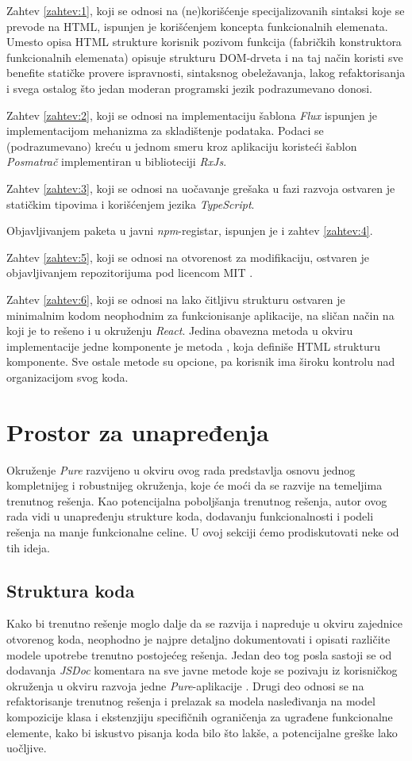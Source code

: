 \documentclass[12pt,oneside]{memoir}
\newcommand{\code}[1]{\allowbreak{\colorbox{codegray}{\texttt{\scalebox{0.9}{#1}}}}}%
\begin{document}
Zahtev \ref{zahtev:1}, koji se odnosi na (ne)korišćenje
specijalizovanih sintaksi koje se prevode na HTML, ispunjen je
korišćenjem koncepta funkcionalnih elemenata. Umesto opisa HTML
strukture korisnik pozivom funkcija (fabričkih konstruktora
funkcionalnih elemenata) opisuje strukturu DOM-drveta i na taj način
koristi sve benefite statičke provere ispravnosti, sintaksnog
obeležavanja, lakog refaktorisanja i svega ostalog što jedan moderan
programski jezik podrazumevano donosi.

Zahtev \ref{zahtev:2}, koji se odnosi na implementaciju šablona
\emph{Flux} ispunjen je implementacijom \code{Store<Model>}
mehanizma za skladištenje podataka. Podaci se (podrazumevano) kreću
u jednom smeru kroz aplikaciju koristeći šablon \emph{Posmatrač}
implementiran u biblioteciji \emph{RxJs}.

Zahtev \ref{zahtev:3}, koji se odnosi na uočavanje grešaka u fazi razvoja ostvaren je statičkim tipovima i korišćenjem jezika \emph{TypeScript}.

Objavljivanjem paketa u javni \emph{npm}-registar, ispunjen je i zahtev \ref{zahtev:4}.

Zahtev \ref{zahtev:5}, koji se odnosi na otvorenost za modifikaciju,
ostvaren je objavljivanjem repozitorijuma pod licencom MIT \cite{MIT}.

Zahtev \ref{zahtev:6}, koji se odnosi na lako čitljivu strukturu
ostvaren je minimalnim kodom neophodnim za funkcionisanje
aplikacije, na sličan način na koji je to rešeno i u okruženju
\emph{React}. Jedina obavezna metoda u okviru implementacije jedne
komponente je metoda \code{template()}, koja definiše HTML
strukturu komponente. Sve ostale metode su opcione, pa korisnik ima
široku kontrolu nad organizacijom svog koda.

\section{Prostor za unapređenja}
Okruženje \emph{Pure} razvijeno u okviru ovog rada predstavlja
osnovu jednog kompletnijeg i robustnijeg okruženja, koje će
moći da se razvije na temeljima trenutnog rešenja. Kao potencijalna
poboljšanja trenutnog rešenja, autor ovog rada vidi u unapređenju
strukture koda, dodavanju funkcionalnosti i podeli rešenja na manje
funkcionalne celine. U ovoj sekciji ćemo prodiskutovati neke od tih
ideja.
\subsection{Struktura koda}
Kako bi trenutno rešenje moglo dalje da se razvija i napreduje u
okviru zajednice otvorenog koda, neophodno je najpre detaljno
dokumentovati i opisati različite modele upotrebe trenutno
postojećeg rešenja. Jedan deo tog posla sastoji se od dodavanja
\emph{JSDoc} komentara na sve javne metode koje se pozivaju iz
korisničkog okruženja u okviru razvoja jedne
\emph{Pure}-aplikacije \cite{JSDoc}. Drugi deo odnosi se na refaktorisanje
trenutnog rešenja i prelazak sa modela nasleđivanja na model
kompozicije klasa i ekstenzjiju specifičnih ograničenja za ugrađene
funkcionalne elemente, kako bi iskustvo pisanja koda bilo što lakše,
a potencijalne greške lako uočljive.
\end{document}
